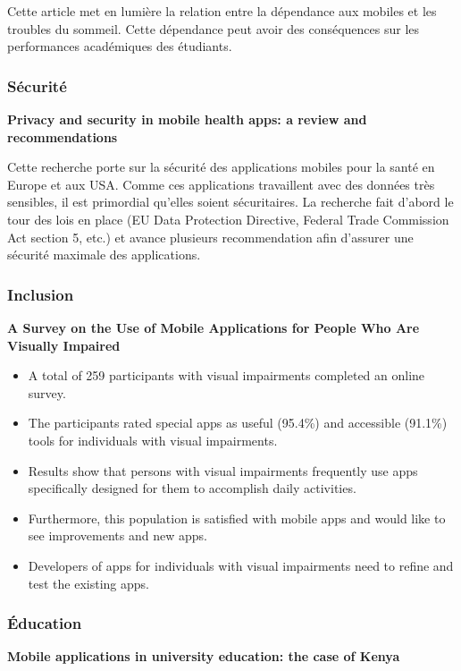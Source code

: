 		Cette article met en lumière la relation entre la dépendance aux mobiles et les troubles du sommeil. Cette dépendance peut avoir des conséquences sur les performances académiques des étudiants.
				
		\subsubsection{Sécurité}
		{\bfseries \cite{privacy} Privacy and security in mobile health apps: a review and recommendations}
		
		Cette recherche porte sur la sécurité des applications mobiles pour la santé en Europe et aux USA. Comme ces applications travaillent avec des données très sensibles, il est primordial qu'elles soient sécuritaires. La recherche fait d'abord le tour des lois en place (EU Data Protection Directive, Federal Trade Commission Act section 5, etc.) et avance plusieurs recommendation afin d'assurer une sécurité maximale des applications.
		
		
		\subsubsection{Inclusion}
		{\bfseries \cite{visuallyImpaired} A Survey on the Use of Mobile Applications for People Who Are Visually Impaired}
		
		\begin{itemize}
			\item A total of 259 participants with visual impairments completed an online survey. 
			\item The participants rated special apps as useful (95.4\%) and accessible (91.1\%) tools for individuals with visual impairments.
			\item Results show that persons with visual impairments frequently use apps specifically designed for them to accomplish daily activities.
			\item Furthermore, this population is satisfied with mobile apps and would like to see improvements and new apps.
			\item Developers of apps for individuals with visual impairments need to refine and test the existing apps. 
		\end{itemize}
		
		\subsubsection{Éducation}
		{\bfseries \cite{kenya} Mobile applications in university education: the case of Kenya}
		
